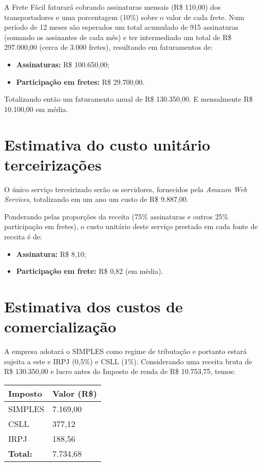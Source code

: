 A Frete Fácil faturará cobrando assinaturas mensais (R\$ 110,00) dos transportadores e uma porcentagem (10\%) sobre o valor de cada frete. Num período de 12 meses são esperados um total acumulado de 915 assinaturas (somando os assinantes de cada mês) e ter intermediado um total de R\$ 297.000,00 (cerca de 3.000 fretes), resultando em faturamentos de:

\begin{itemize}
  \item \textbf{Assinaturas:} R\$ 100.650,00;
  \item \textbf{Participação em fretes:} R\$ 29.700,00.
\end{itemize}

Totalizando então um faturamento anual de R\$ 130.350,00. E mensalmente R\$ 10.100,00 em média.

\section{Estimativa do custo unitário terceirizações}\label{sec:custounitario}

O único serviço terceirizado serão os servidores, fornecidos pela \textit{Amazon Web Services}, totalizando em um ano um custo de R\$ 9.887,00.

Ponderando pelas proporções da receita (75\% assinaturas e outros 25\% participação em fretes), o custo unitário deste serviço prestado em cada fonte de receita é de:

\begin{itemize}
  \item \textbf{Assinatura:} R\$ 8,10;
  \item \textbf{Participação em frete:} R\$ 0,82 (em média).
\end{itemize}

\section{Estimativa dos custos de comercialização}\label{sec:custosdecomercializacao}
A empresa adotará o SIMPLES como regime de tributação e portanto estará sujeita a este e IRPJ (0,5\%) e CSLL (1\%). Considerando uma receita bruta de R\$ 130.350,00 e lucro antes do Imposto de renda de R\$ 10.753,75, temos:
\newline \newline
\begin{tabular}{| l | l |}
  \hline
  \textbf{Imposto} & \textbf{Valor (R\$)}\\ \hline
  SIMPLES & 7.169,00 \\ \hline
  CSLL & 377,12 \\ \hline
  IRPJ & 188,56 \\ \hline
  \textbf{Total:} & 7.734,68 \\ \hline
\end{tabular}

